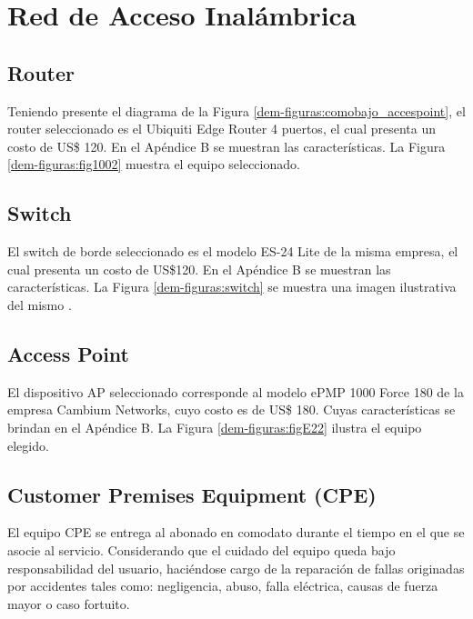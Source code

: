 \section{Red de Acceso Inalámbrica}
\subsection{Router}
Teniendo presente el diagrama de la Figura \ref{dem-figuras:comobajo_accespoint}, el router seleccionado es el Ubiquiti Edge Router 4 puertos, el cual presenta un costo de US\$ 120. En el Apéndice B se muestran las  características. La Figura \ref{dem-figuras:fig1002} muestra el equipo seleccionado.



\subsection{Switch}
El switch de borde seleccionado es el modelo ES-24 Lite de la misma empresa, el cual presenta un costo de US\$120. En el Apéndice B se muestran las características. La Figura \ref{dem-figuras:switch} se muestra una imagen ilustrativa del mismo \cite{switch}.



\subsection{Access Point}
El dispositivo AP seleccionado corresponde al modelo ePMP 1000 Force 180 de la empresa Cambium Networks, cuyo costo es de US\$ 180. Cuyas características se brindan en el Apéndice B. La Figura \ref{dem-figuras:figE22} ilustra el equipo elegido.


\subsection{Customer Premises Equipment (CPE)}
El equipo CPE se entrega al abonado en comodato durante el tiempo en el que se asocie al servicio. Considerando que el cuidado del equipo queda bajo responsabilidad del usuario, haciéndose cargo de la reparación de fallas originadas por accidentes tales como: negligencia, abuso, falla eléctrica, causas de fuerza mayor o caso fortuito.

